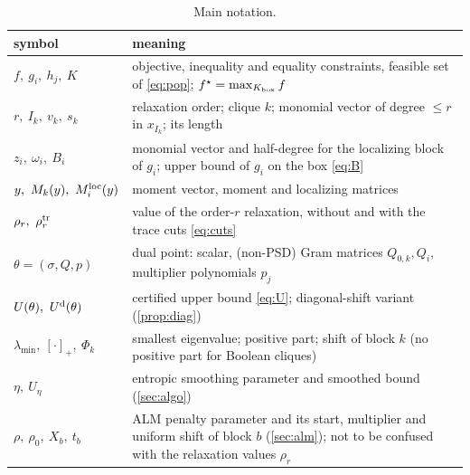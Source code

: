 \documentclass[a4paper,11pt]{article}
\theoremstyle{plain}
\theoremstyle{definition}
\theoremstyle{remark}
\newcommand{\lmin}{\lambda_{\min}}
\newcommand{\pos}[1]{[#1]_+}
\begin{document}
\begin{table}[t]\centering\small
\setlength{\tabcolsep}{4pt}\renewcommand{\arraystretch}{1.1}
\begin{tabular}{@{}p{3.1cm} p{11.9cm}@{}}\toprule
symbol & meaning\\\midrule
$f,\ g_i,\ h_j,\ K$ & objective, inequality and equality constraints, feasible set of \eqref{eq:pop}; $f^\star=\max_{K_{\rm box}}f$\\
$r,\ I_k,\ v_k,\ s_k$ & relaxation order; clique $k$; monomial vector of degree $\le r$ in $x_{I_k}$; its length\\
$z_i,\ \omega_i,\ B_i$ & monomial vector and half-degree for the localizing block of $g_i$; upper bound of $g_i$ on the box \eqref{eq:B}\\
$y,\ M_k(y),\ M_i^{\rm loc}(y)$ & moment vector, moment and localizing matrices\\
$\rho_r,\ \rho_r^{\rm tr}$ & value of the order-$r$ relaxation, without and with the trace cuts \eqref{eq:cuts}\\
$\theta=(\sigma,Q,p)$ & dual point: scalar, (non-PSD) Gram matrices $Q_{0,k},Q_i$, multiplier polynomials $p_j$\\
$U(\theta),\ U^{\rm d}(\theta)$ & certified upper bound \eqref{eq:U}; diagonal-shift variant (\cref{prop:diag})\\
$\lmin,\ \pos{\cdot},\ \Phi_k$ & smallest eigenvalue; positive part; shift of block $k$ (no positive part for Boolean cliques)\\
$\eta,\ U_\eta$ & entropic smoothing parameter and smoothed bound (\cref{sec:algo})\\
$\rho,\ \rho_0,\ X_b,\ t_b$ & ALM penalty parameter and its start, multiplier and uniform shift of block $b$ (\cref{sec:alm}); not to be confused with the relaxation values $\rho_r$\\
\bottomrule\end{tabular}
\caption{Main notation.}\label{tab:notation}
\end{table}
\end{document}
